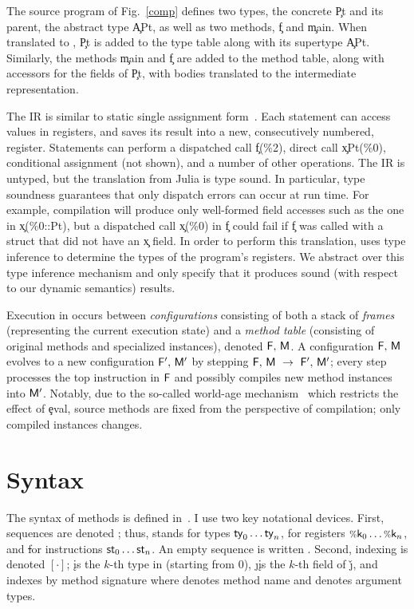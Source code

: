 The source program of Fig.~\ref{comp} defines two types, the concrete \c{Pt} and
its parent, the abstract type \c{APt}, as well as two methods, \c{f} and
\c{main}. When translated to \jules, \c{Pt} is added to the type table along
with its supertype \c{APt}. Similarly, the methods \c{main} and \c{f} are added
to the \jules method table, along with accessors for the fields of \c{Pt}, with
bodies translated to the \jules intermediate representation.

The \jules IR is similar to static single assignment form~\cite{ssa}. Each statement can
access values in registers, and saves its result into a new, consecutively
numbered, register. Statements can perform a dispatched call \c{f(\%2)}, direct
call \c{x\!Pt(\%0)}, conditional assignment (not shown), and a number of other
operations. The IR is untyped, but the translation from Julia is type sound. In
particular, type soundness guarantees that only dispatch errors can occur at run
time. For example, compilation will produce only well-formed field accesses such
as the one in \c{x(\%0::Pt)}, but a dispatched call \c{x(\%0)} in \c{f} could
fail if \c{f} was called with a struct that did not have an \c{x} field. In
order to perform this translation, \jules uses type inference to determine the
types of the program's registers. We abstract over this type inference mechanism
and only specify that it produces sound (with respect to our dynamic semantics)
results. %

Execution in \jules occurs between \emph{configurations} consisting of both
a stack of \emph{frames} \frm (representing the current execution state)
and a \emph{method table} \mtbl (consisting of original methods and specialized
instances), denoted $\mathsf{F},\, \mathsf{M}$. A configuration
$\mathsf{F},\, \mathsf{M}$ evolves to a new configuration
$\mathsf{F}',\, \mathsf{M}'$ by stepping $\mathsf{F},\, \mathsf{M} ~\rightarrow~
\mathsf{F}',\, \mathsf{M}'$; every step processes the top instruction in $\mathsf{F}$
and possibly compiles new method instances into $\mathsf{M}'$. Notably, due to the
so-called world-age mechanism~\cite{oopsla20a} which restricts the effect
of \c{eval}, source methods are fixed from the
perspective of compilation; only compiled instances changes.

\section{Syntax}

The syntax of \jules methods is defined in~. I use two key
notational devices. First, sequences are denoted \ol{\,\cdot\,}; thus, \ol\ty
stands for types $\mathsf{ty}_0\dots\mathsf{ty}_n$, \ol{\v\k} for registers $\v\k_0\dots\v\k_n$,
and \ol\st for instructions $\mathsf{st}_0\dots\mathsf{st}_n$. An empty sequence is written
\emp. Second, indexing is denoted $[\cdot]$; \idx{\ol\ty}\k is the $k$-th type
in \ol\ty (starting from 0), \get\j\k is the $k$-th field of \v\j, and
\idx\mtbl{\msig\m{\ol\ty}} indexes \mtbl by method signature where \m denotes
method name and \ol\ty denotes argument types.

